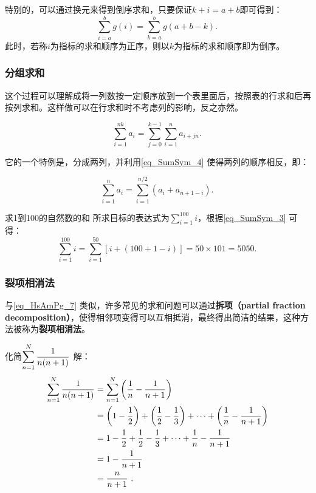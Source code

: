 特别的，可以通过换元来得到倒序求和，只要保证$k+i=a+b$即可得到：
\begin{equation}\label{eq_SumSym_4}
\sum_{i=a}^b g(i) = \sum_{k=a}^{b} g(a+b-k).~
\end{equation}
此时，若称$i$为指标的求和顺序为正序，则以$k$为指标的求和顺序即为倒序。

\subsubsection{分组求和}

这个过程可以理解成将一列数按一定顺序放到一个表里面后，按照表的行求和后再按列求和。这样做可以在行求和时不考虑列的影响，反之亦然。

\begin{equation}
\sum_{i=1}^{nk} a_i = \sum_{j=0}^{k-1} \sum_{i=1}^n a_{i+jn}.~
\end{equation}

它的一个特例是，分成两列，并利用\autoref{eq_SumSym_4} 使得两列的顺序相反，即：

\begin{equation}\label{eq_SumSym_3}
\sum_{i=1}^n a_i = \sum_{i=1}^{n/2} (a_i + a_{n+1-i}).~
\end{equation}

\begin{example}{求1到100的自然数的和}
所求目标的表达式为$\sum\limits_{i=1}^{100} i$，根据\autoref{eq_SumSym_3} 可得：
$$\sum\limits_{i=1}^{100} i= \sum_{i=1}^{50} [i + (100+1-i)]=50\times101=5050.~$$
\end{example}

\subsubsection{裂项相消法}

与\autoref{eq_HsAmPg_7} 类似，许多常见的求和问题可以通过\textbf{拆项（partial fraction decomposition）}，使得相邻项变得可以互相抵消，最终得出简洁的结果，这种方法被称为\textbf{裂项相消法}。
\begin{example}{化简$\displaystyle\sum_{n=1}^N {1\over n(n+1)}$}\label{ex_SumSym_2}
解：
\begin{equation}
\begin{split}
\sum_{n=1}^N {1\over n(n+1)}&=\sum_{n=1}^N \left({1\over n}-{1\over n+1}\right)\\
&=\left(1-{1\over2}\right)+\left({1\over2}-{1\over3}\right)+\cdots+\left({1\over n}-{1\over n+1}\right)\\
&=1-{1\over2}+{1\over2}-{1\over3}+\cdots+{1\over n}-{1\over n+1}\\
&=1-{1\over n+1}\\
&={n\over n+1}~.\\
\end{split}
\end{equation}
\end{example}

